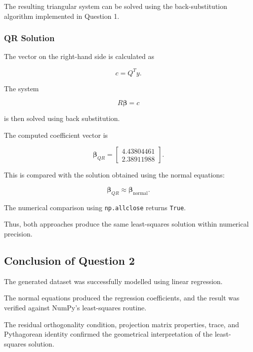 \documentclass[12pt,a4paper]{article}
\numberwithin{equation}{section}
\begin{document}
The resulting triangular system can be solved
using the back-substitution algorithm implemented
in Question 1.

\subsubsection{QR Solution}

The vector on the right-hand side is calculated as

\begin{equation}
c=Q^Ty.
\end{equation}

The system

\begin{equation}
R\boldsymbol{\beta}=c
\end{equation}

is then solved using back substitution.

The computed coefficient vector is

\begin{equation}
\boxed{
\boldsymbol{\beta}_{QR}
=
\begin{bmatrix}
4.43804461\\
2.38911988
\end{bmatrix}
}.
\end{equation}

This is compared with the solution obtained
using the normal equations:

\begin{equation}
\boldsymbol{\beta}_{QR}
\approx
\boldsymbol{\beta}_{\mathrm{normal}}.
\end{equation}

The numerical comparison using \texttt{np.allclose}
returns \texttt{True}.

Thus, both approaches produce the same
least-squares solution within numerical precision.

\subsection{Conclusion of Question 2}

The generated dataset was successfully modelled
using linear regression.

The normal equations produced the regression
coefficients, and the result was verified against
NumPy's least-squares routine.

The residual orthogonality condition, projection
matrix properties, trace, and Pythagorean identity
confirmed the geometrical interpretation of the
least-squares solution.
\end{document}
